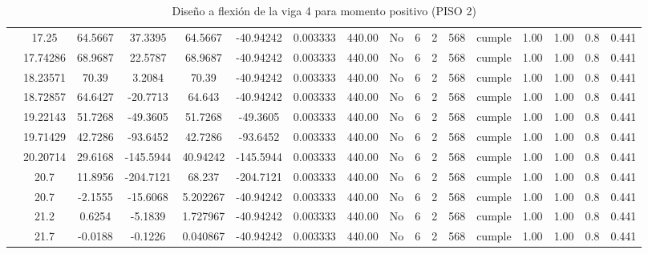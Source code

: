 \begin{table}[H]
{\begin{tabular}{|c|c|c|c|c|c|c|c|c|c|c|c|c|c|c|c|c|}
\cline{2-17}        & 17.25 & 64.5667 & 37.3395 & 64.5667 & -40.94242 & 0.003333 & 440.00 & No  & 6   & 2   & 568 & \cellcolor[rgb]{ .776,  .937,  .808}cumple & 1.00 & 1.00 & 0.8 & 0.441 \bigstrut\\
\cline{2-17}        & 17.74286 & 68.9687 & 22.5787 & 68.9687 & -40.94242 & 0.003333 & 440.00 & No  & 6   & 2   & 568 & \cellcolor[rgb]{ .776,  .937,  .808}cumple & 1.00 & 1.00 & 0.8 & 0.441 \bigstrut\\
\cline{2-17}        & 18.23571 & 70.39 & 3.2084 & 70.39 & -40.94242 & 0.003333 & 440.00 & No  & 6   & 2   & 568 & \cellcolor[rgb]{ .776,  .937,  .808}cumple & 1.00 & 1.00 & 0.8 & 0.441 \bigstrut\\
\cline{2-17}        & 18.72857 & 64.6427 & -20.7713 & 64.643 & -40.94242 & 0.003333 & 440.00 & No  & 6   & 2   & 568 & \cellcolor[rgb]{ .776,  .937,  .808}cumple & 1.00 & 1.00 & 0.8 & 0.441 \bigstrut\\
\cline{2-17}        & 19.22143 & 51.7268 & -49.3605 & 51.7268 & -49.3605 & 0.003333 & 440.00 & No  & 6   & 2   & 568 & \cellcolor[rgb]{ .776,  .937,  .808}cumple & 1.00 & 1.00 & 0.8 & 0.441 \bigstrut\\
\cline{2-17}        & 19.71429 & 42.7286 & -93.6452 & 42.7286 & -93.6452 & 0.003333 & 440.00 & No  & 6   & 2   & 568 & \cellcolor[rgb]{ .776,  .937,  .808}cumple & 1.00 & 1.00 & 0.8 & 0.441 \bigstrut\\
\cline{2-17}        & 20.20714 & 29.6168 & -145.5944 & 40.94242 & -145.5944 & 0.003333 & 440.00 & No  & 6   & 2   & 568 & \cellcolor[rgb]{ .776,  .937,  .808}cumple & 1.00 & 1.00 & 0.8 & 0.441 \bigstrut\\
\cline{2-17}        & \cellcolor[rgb]{ .851,  .882,  .949}20.7 & 11.8956 & -204.7121 & 68.237 & -204.7121 & 0.003333 & 440.00 & No  & 6   & 2   & 568 & \cellcolor[rgb]{ .776,  .937,  .808}cumple & 1.00 & 1.00 & 0.8 & 0.441 \bigstrut\\
\cline{2-17}        & \cellcolor[rgb]{ .851,  .882,  .949}20.7 & -2.1555 & -15.6068 & 5.202267 & -40.94242 & 0.003333 & 440.00 & No  & 6   & 2   & 568 & \cellcolor[rgb]{ .776,  .937,  .808}cumple & 1.00 & 1.00 & 0.8 & 0.441 \bigstrut\\
\cline{2-17}        & 21.2 & 0.6254 & -5.1839 & 1.727967 & -40.94242 & 0.003333 & 440.00 & No  & 6   & 2   & 568 & \cellcolor[rgb]{ .776,  .937,  .808}cumple & 1.00 & 1.00 & 0.8 & 0.441 \bigstrut\\
\cline{2-17}        & 21.7 & -0.0188 & -0.1226 & 0.040867 & -40.94242 & 0.003333 & 440.00 & No  & 6   & 2   & 568 & \cellcolor[rgb]{ .776,  .937,  .808}cumple & 1.00 & 1.00 & 0.8 & 0.441 \bigstrut\\
    \hline
    \end{tabular}%
    
  
}%
    \caption{Diseño a flexión de la viga 4 para momento positivo (PISO 2) }
  \label{tab:F VG4 P2 M+}%
\end{table}%
